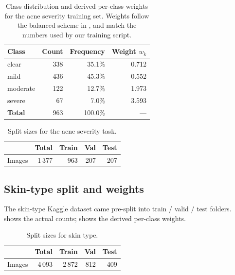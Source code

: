\documentclass[11pt,a4paper,oneside]{report}
\begin{document}
\begin{table}[htbp]
    \centering
    \caption{Class distribution and derived per-class weights for
    the acne severity training set. Weights follow the balanced
    scheme in , and match the numbers used by our
    training script.}
    \label{tab:acne-weights}
    \small
    \begin{tabular}{lrrr}
        \toprule
        \textbf{Class} & \textbf{Count} & \textbf{Frequency} & \textbf{Weight \(w_k\)} \\
        \midrule
        clear    & 338 & 35.1\% & 0.712 \\
        mild     & 436 & 45.3\% & 0.552 \\
        moderate & 122 & 12.7\% & 1.973 \\
        severe   &  67 &  7.0\% & 3.593 \\
        \midrule
        \textbf{Total} & 963 & 100.0\% & --- \\
        \bottomrule
    \end{tabular}
\end{table}

\begin{table}[htbp]
    \centering
    \caption{Split sizes for the acne severity task.}
    \label{tab:splits-acne}
    \small
    \begin{tabular}{lrrrr}
        \toprule
        & \textbf{Total} & \textbf{Train} & \textbf{Val} & \textbf{Test} \\
        \midrule
        Images & 1\,377 & 963 & 207 & 207 \\
        \bottomrule
    \end{tabular}
\end{table}

\subsection{Skin-type split and weights}

The skin-type Kaggle dataset came pre-split into train / valid /
test folders.  shows the actual counts;
 shows the derived per-class weights.

\begin{table}[htbp]
    \centering
    \caption{Split sizes for skin type.}
    \label{tab:skin-type-splits}
    \small
    \begin{tabular}{lrrrr}
        \toprule
        & \textbf{Total} & \textbf{Train} & \textbf{Val} & \textbf{Test} \\
        \midrule
        Images & 4\,093 & 2\,872 & 812 & 409 \\
        \bottomrule
    \end{tabular}
\end{table}
\end{document}
